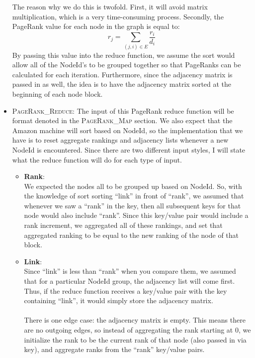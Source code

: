 \begin{itemize}
        The reason why we do this is twofold. First, it will avoid matrix multiplication, which is a very time-consuming process. Secondly, the PageRank value for each node in the graph is equal to:
        $$ r_j = \sum_{(j, i) \in E} \frac{r_i}{d_i} $$
        By passing this value into the reduce function, we assume the sort would allow all of the NodeId's to be grouped together so that PageRanks can be calculated for each iteration. Furthermore, since the adjacency matrix is passed in as well, the idea is to have the adjacency matrix sorted at the beginning of each node block.
        \vspace{5mm}
        \item \textsc{PageRank\_Reduce}: 
        The input of this PageRank reduce function will be format denoted in the \textsc{PageRank\_Map} section. We also expect that the Amazon machine will sort based on NodeId, so the implementation that we have is to reset aggregate rankings and adjacency lists whenever a new NodeId is encountered. Since there are two different input styles, I will state what the reduce function will do for each type of input.
        \begin{itemize}
            \item \textbf{Rank}: \\
                We expected the nodes all to be grouped up based on NodeId. So, with the knowledge of sort sorting ``link'' in front of ``rank'', we assumed that whenever we saw a ``rank'' in the key, then all subsequent keys for that node would also include ``rank''. Since this key/value pair would include 
                a rank increment, we aggregated all of these rankings, and set that aggregated ranking to be equal to the new ranking of the node of that block. 
                
            \item \textbf{Link}: \\
                Since ``link'' is less than ``rank'' when you compare them, we assumed that for a particular NodeId group, the adjacency list will come first. Thus, if the reduce function receives a key/value pair with the key containing ``link'', it would simply store the adjacency matrix.
                \\ \\
                There is one edge case: the adjacency matrix is empty. This means there are no outgoing edges, so instead of aggregating the rank starting at 0, we initialize the rank to be the current rank of that node (also passed in via key), and aggregate ranks from the ``rank'' key/value pairs.
        \end{itemize}


\end{itemize}
